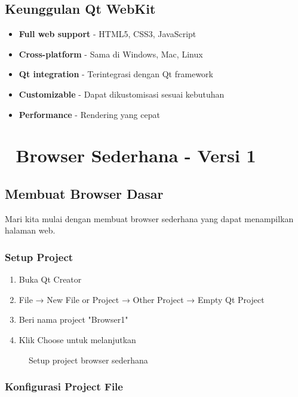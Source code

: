 \subsection{Keunggulan Qt WebKit}

\begin{itemize}
\item \textbf{Full web support} - HTML5, CSS3, JavaScript
\item \textbf{Cross-platform} - Sama di Windows, Mac, Linux
\item \textbf{Qt integration} - Terintegrasi dengan Qt framework
\item \textbf{Customizable} - Dapat dikustomisasi sesuai kebutuhan
\item \textbf{Performance} - Rendering yang cepat
\end{itemize}

\section{🚀 Browser Sederhana - Versi 1}

\subsection{Membuat Browser Dasar}

Mari kita mulai dengan membuat browser sederhana yang dapat menampilkan halaman web.

\subsubsection{Setup Project}

\begin{enumerate}
\item Buka Qt Creator
\item File → New File or Project → Other Project → Empty Qt Project
\item Beri nama project "Browser1"
\item Klik Choose untuk melanjutkan
\end{enumerate}

\begin{figure}[htbp]
\centering
{}
\caption{Setup project browser sederhana}
\end{figure}

\subsubsection{Konfigurasi Project File}

